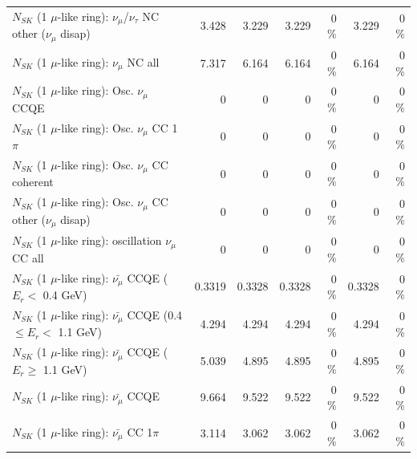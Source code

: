 \begin{table}
\begin{tabular}{| l | r | r | r  r | r  r |}
   $N_{SK}$ (1 $\mu$-like ring): $\nu_\mu$/$\nu_\tau$ NC other ($\nu_\mu$ disap) &           3.428 &           3.229 &           3.229 &        0 \%  &           3.229 &        0 \%  \\ 
                                $N_{SK}$ (1 $\mu$-like ring): $\nu_{\mu}$ NC all &           7.317 &           6.164 &           6.164 &        0 \%  &           6.164 &        0 \%  \\ 
\hline
\hline
                               $N_{SK}$ (1 $\mu$-like ring): Osc. $\nu_\mu$ CCQE &               0 &               0 &               0 &        0 \%  &               0 &        0 \%  \\ 
                          $N_{SK}$ (1 $\mu$-like ring): Osc. $\nu_\mu$ CC 1$\pi$ &               0 &               0 &               0 &        0 \%  &               0 &        0 \%  \\ 
                        $N_{SK}$ (1 $\mu$-like ring): Osc. $\nu_\mu$ CC coherent &               0 &               0 &               0 &        0 \%  &               0 &        0 \%  \\ 
         $N_{SK}$ (1 $\mu$-like ring): Osc. $\nu_\mu$ CC other ($\nu_\mu$ disap) &               0 &               0 &               0 &        0 \%  &               0 &        0 \%  \\ 
                      $N_{SK}$ (1 $\mu$-like ring): oscillation $\nu_\mu$ CC all &               0 &               0 &               0 &        0 \%  &               0 &        0 \%  \\ 
\hline
\hline
          $N_{SK}$ (1 $\mu$-like ring): $\bar{\nu_\mu}$ CCQE ($E_{r} <$ 0.4 GeV) &          0.3319 &          0.3328 &          0.3328 &        0 \%  &          0.3328 &        0 \%  \\ 
 $N_{SK}$ (1 $\mu$-like ring): $\bar{\nu_\mu}$ CCQE (0.4 $\leq E_{r} <$ 1.1 GeV) &           4.294 &           4.294 &           4.294 &        0 \%  &           4.294 &        0 \%  \\ 
       $N_{SK}$ (1 $\mu$-like ring): $\bar{\nu_\mu}$ CCQE ($E_{r} \geq$ 1.1 GeV) &           5.039 &           4.895 &           4.895 &        0 \%  &           4.895 &        0 \%  \\ 
\hline
                              $N_{SK}$ (1 $\mu$-like ring): $\bar{\nu_\mu}$ CCQE &           9.664 &           9.522 &           9.522 &        0 \%  &           9.522 &        0 \%  \\ 
                         $N_{SK}$ (1 $\mu$-like ring): $\bar{\nu_\mu}$ CC 1$\pi$ &           3.114 &           3.062 &           3.062 &        0 \%  &           3.062 &        0 \%  \\ 

\end{tabular}
\end{table}
